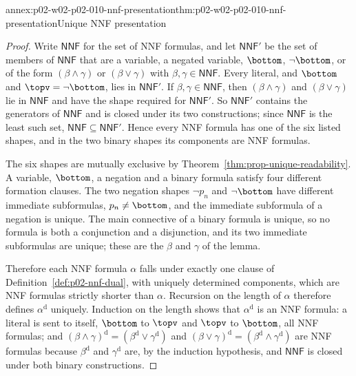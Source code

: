 \begin{annexitem}{annex:p02-w02-p02-010-nnf-presentation}{thm:p02-w02-p02-010-nnf-presentation}{Unique NNF presentation}
\begin{proof}
Write \(\mathsf{NNF}\) for the set of NNF formulas, and let \(\mathsf{NNF}'\) be
the set of members of \(\mathsf{NNF}\) that are a variable, a negated variable,
\(\bottom\), \(\neg\bottom\), or of the form \((\beta\land\gamma)\) or
\((\beta\lor\gamma)\) with \(\beta,\gamma\in\mathsf{NNF}\).  Every literal, and
\(\bottom\) and \(\topv=\neg\bottom\), lies in \(\mathsf{NNF}'\).  If
\(\beta,\gamma\in\mathsf{NNF}\), then \((\beta\land\gamma)\) and
\((\beta\lor\gamma)\) lie in \(\mathsf{NNF}\) and have the shape required for
\(\mathsf{NNF}'\).  So \(\mathsf{NNF}'\) contains the generators of \(\mathsf{NNF}\)
and is closed under its two constructions; since \(\mathsf{NNF}\) is the least
such set, \(\mathsf{NNF}\subseteq\mathsf{NNF}'\).  Hence every NNF formula has one
of the six listed shapes, and in the two binary shapes its components are NNF
formulas.

The six shapes are mutually exclusive by
Theorem~\ref{thm:prop-unique-readability}.  A variable, \(\bottom\), a
negation and a binary formula satisfy four different formation clauses.  The
two negation shapes \(\neg p_n\) and \(\neg\bottom\) have different immediate
subformulas, \(p_n\ne\bottom\), and the immediate subformula of a negation is
unique.  The main connective of a binary formula is unique, so no formula is
both a conjunction and a disjunction, and its two immediate subformulas are
unique; these are the \(\beta\) and \(\gamma\) of the lemma.

Therefore each NNF formula \(\alpha\) falls under exactly one clause of
Definition~\ref{def:p02-nnf-dual}, with uniquely determined components, which
are NNF formulas strictly shorter than \(\alpha\).  Recursion on the length of
\(\alpha\) therefore defines \(\alpha^{\mathrm d}\) uniquely.  Induction on the
length shows that \(\alpha^{\mathrm d}\) is an NNF formula: a literal is sent
to itself, \(\bottom\) to \(\topv\) and \(\topv\) to \(\bottom\), all NNF
formulas; and \((\beta\land\gamma)^{\mathrm d}=(\beta^{\mathrm d}\lor\gamma^{\mathrm d})\)
and \((\beta\lor\gamma)^{\mathrm d}=(\beta^{\mathrm d}\land\gamma^{\mathrm d})\)
are NNF formulas because \(\beta^{\mathrm d}\) and \(\gamma^{\mathrm d}\) are,
by the induction hypothesis, and \(\mathsf{NNF}\) is closed under both binary
constructions.
\end{proof}
\end{annexitem}

